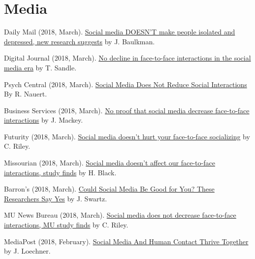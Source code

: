 \section{Media}
  \begin{bibenum}
    \item[] Daily Mail (2018, March).
      \href{http://www.dailymail.co.uk/health/article-5455279/Facebook-does-NOT-decrease-social-interaction.html}{Social media DOESN'T make people isolated and depressed, new research suggests} by J. Baulkman.
    \item[] Digital Journal (2018, March).
      \href{http://www.digitaljournal.com/tech-and-science/technology/no-decline-in-face-to-face-interactions-in-the-social-media-era/article/516359}{No decline in face-to-face interactions in the social media era} by T. Sandle.
    \item[] Psych Central (2018, March).
      \href{https://psychcentral.com/news/2018/03/02/social-media-does-not-reduce-social-interactions/133209.html}{Social Media Does Not Reduce Social Interactions} By R. Nauert.
    \item[] Business Services (2018, March).
      \href{http://businessservices24.com/44/no-proof-that-social-media-decrease-face-to-face-interactions/}{No proof that social media decrease face-to-face interactions} by J. Mackey.
    \item[] Futurity (2018, March).
      \href{http://www.futurity.org/social-media-social-interactions-1692872/}{Social media doesn’t hurt your face-to-face socializing} by C. Riley.
    \item[] Missourian (2018, March).
      \href{https://www.columbiamissourian.com/news/higher_education/social-media-doesn-t-affect-our-face-to-face-interactions/article_7f2643a2-1e4e-11e8-8fe8-079f195a6de9.html}{Social media doesn't affect our face-to-face interactions, study finds} by H. Black.
    \item[] Barron's (2018, March).
      \href{https://www.barrons.com/articles/could-social-media-be-good-for-you-these-researchers-say-yes-1519932207}{Could Social Media Be Good for You? These Researchers Say Yes} by J. Swartz.
    \item[] MU News Bureau (2018, March).
      \href{https://munews.missouri.edu/news-releases/2018/0301-social-media-does-not-decrease-face-to-face-interactions-mu-study-finds/}{Social media does not decrease face-to-face interactions, MU study finds} by C. Riley.
    \item[] MediaPost (2018, February).
      \href{https://mediapost.com/publications/article/315106/social-media-and-human-contact-thrive-together.html}{Social Media And Human Contact Thrive Together} by J. Loechner.

\end{bibenum}
